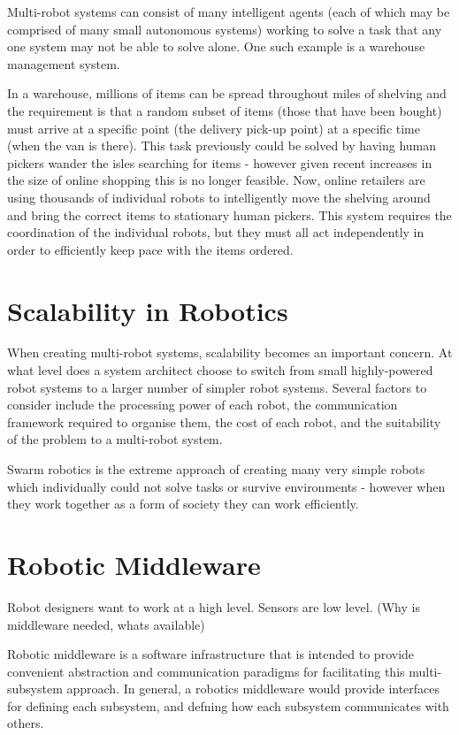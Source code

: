 \documentclass[../dissertation.tex]{subfiles}
\begin{document}
Multi-robot systems can consist of many intelligent agents (each of which may be comprised of many small autonomous systems) working to solve a task that any one system may not be able to solve alone. One such example is a warehouse management system.

In a warehouse, millions of items can be spread throughout miles of shelving and the requirement is that a random subset of items (those that have been bought) must arrive at a specific point (the delivery pick-up point) at a specific time (when the van is there). This task previously could be solved by having human pickers wander the isles searching for items - however given recent increases in the size of online shopping this is no longer feasible. Now, online retailers are using thousands of individual robots to intelligently move the shelving around and bring the correct items to stationary human pickers. This system requires the coordination of the individual robots, but they must all act independently in order to efficiently keep pace with the items ordered.

\section{Scalability in Robotics}

When creating multi-robot systems, scalability becomes an important concern. At what level does a system architect choose to switch from small highly-powered robot systems to a larger number of simpler robot systems. Several factors to consider include the processing power of each robot, the communication framework required to organise them, the cost of each robot, and the suitability of the problem to a multi-robot system.

Swarm robotics is the extreme approach of creating many very simple robots which individually could not solve tasks or survive environments - however when they work together as a form of society they can work efficiently.

\section{Robotic Middleware}

Robot designers want to work at a high level. Sensors are low level. (Why is middleware needed, whats available)

Robotic middleware is a software infrastructure that is intended to provide convenient abstraction and communication paradigms for facilitating this multi-subsystem approach. In general, a robotics middleware would provide interfaces for defining each subsystem, and defning how each subsystem communicates with others.
\end{document}
